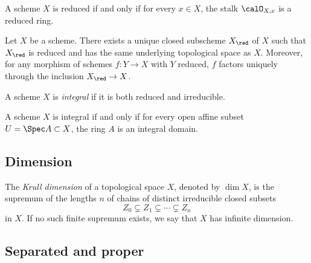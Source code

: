     \begin{proposition}\label{prop:reducedness_is_a_local_property}
        A scheme \(X\) is reduced if and only if for every \(x \in X\), the stalk \(\calO_{X,x}\) is a reduced ring.
    \end{proposition}

    \begin{proposition}\label{prop:universal_property_of_reduced_structure_on_a_scheme}
        Let \(X\) be a scheme.
        There exists a unique closed subscheme \(X_{\red}\) of \(X\) such that \(X_{\red}\) is reduced and has the same underlying topological space as \(X\).
        Moreover, for any morphism of schemes \(f : Y \to X\) with \(Y\) reduced, \(f\) factors uniquely through the inclusion \(X_{\red} \to X\).
    \end{proposition}

    \begin{definition}\label{def:integral_scheme}
        A scheme \(X\) is \emph{integral} if it is both reduced and irreducible.
    \end{definition}

    \begin{proposition}\label{prop:integral_scheme_characterization}
        A scheme \(X\) is integral if and only if for every open affine subset \(U = \Spec A \subset X\), the ring \(A\) is an integral domain.
    \end{proposition}

\subsection{Dimension}

    \begin{definition}\label{def:krull_dimension_of_topological_space}
        The \emph{Krull dimension} of a topological space \(X\), denoted by \(\dim X\), is the supremum of the lengths \(n\) of chains of distinct irreducible closed subsets
        \[ Z_0 \subsetneq Z_1 \subsetneq \cdots \subsetneq Z_n \]
        in \(X\).
        If no such finite supremum exists, we say that \(X\) has infinite dimension.
    \end{definition}

\subsection{Separated and proper}

